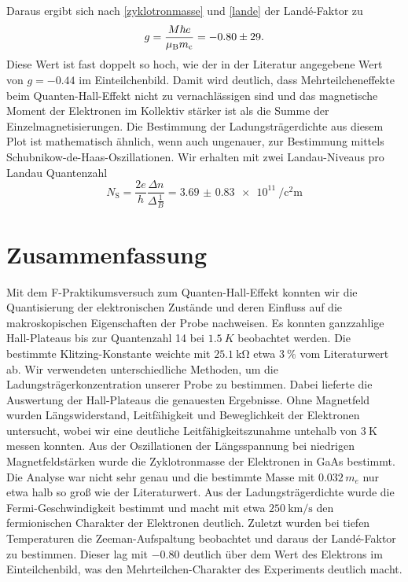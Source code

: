 \documentclass[paper=a4,fontsize=10pt,DIV=18,twocolumn,parskip=half]{scrartcl}
\numberwithin{equation}{section}    %
\begin{document}
Daraus ergibt sich nach \ref{zyklotronmasse} und \eqref{lande} der Landé-Faktor zu
\begin{equation}
g=\frac{M \hbar e}{\mu_{\rm B} m_{\rm c}}=-0.80\pm29.
\end{equation}
Diese Wert ist fast doppelt so hoch, wie der in der Literatur \citep{anleitung} angegebene Wert von $g=-0.44$ im Einteilchenbild. Damit wird deutlich, dass Mehrteilcheneffekte beim Quanten-Hall-Effekt nicht zu vernachlässigen sind und das magnetische Moment der Elektronen im Kollektiv stärker ist als die Summe der Einzelmagnetisierungen.
Die Bestimmung der Ladungsträgerdichte aus diesem Plot ist mathematisch ähnlich, wenn auch ungenauer, zur Bestimmung mittels Schubnikow-de-Haas-Oszillationen.
Wir erhalten mit zwei Landau-Niveaus pro Landau Quantenzahl
\begin{equation}
N_\mathrm{S}=\frac{2e}{h}\frac{\Delta n}{\Delta \frac{1}{B}}=\SI{3.69(083)e11}{\per\square\centi\meter}
\end{equation}

\section{Zusammenfassung}
\label{Zusammenfassung}

Mit dem F-Praktikumsversuch zum Quanten-Hall-Effekt konnten wir die Quantisierung
der elektronischen Zustände und deren Einfluss auf die makroskopischen Eigenschaften 
der Probe nachweisen. Es konnten ganzzahlige Hall-Plateaus bis zur Quantenzahl 14 bei 
$\SI{1.5}{K}$ beobachtet werden. Die bestimmte Klitzing-Konstante weichte 
mit $\SI{25.1}{\kilo\ohm}$ etwa $\SI{3}{\percent}$ vom Literaturwert ab.
Wir verwendeten unterschiedliche Methoden, um die Ladungsträgerkonzentration unserer
Probe zu bestimmen. Dabei lieferte die Auswertung der Hall-Plateaus die genauesten 
Ergebnisse. Ohne Magnetfeld wurden Längswiderstand, Leitfähigkeit und Beweglichkeit 
der Elektronen untersucht, wobei wir eine deutliche Leitfähigkeitszunahme untehalb von 
$\SI{3}{\kelvin}$ messen konnten. Aus der Oszillationen der Längsspannung bei niedrigen 
Magnetfeldstärken wurde die Zyklotronmasse der Elektronen in GaAs bestimmt. Die 
Analyse war nicht sehr genau und die bestimmte Masse mit $0.032\,m_e$ nur etwa halb 
so groß wie der Literaturwert. Aus der Ladungsträgerdichte wurde die Fermi-Geschwindigkeit 
bestimmt und macht mit etwa $\SI[per-mode=symbol]{250}{\kilo\meter\per\second}$ den fermionischen Charakter
der Elektronen deutlich. Zuletzt wurden bei tiefen Temperaturen die Zeeman-Aufspaltung 
beobachtet und daraus der Landé-Faktor zu bestimmen. Dieser lag mit $-0.80$ deutlich über
dem Wert des Elektrons im Einteilchenbild, was den Mehrteilchen-Charakter des Experiments
deutlich macht.
\end{document}
